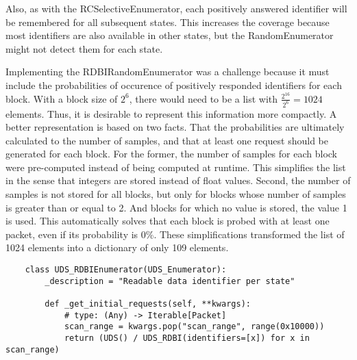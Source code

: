 Also, as with the RCSelectiveEnumerator, each positively answered identifier will be remembered for all subsequent states. This increases the coverage because most identifiers are also available in other states, but the RandomEnumerator might not detect them for each state.

Implementing the RDBIRandomEnumerator was a challenge because it must include the probabilities of occurence of positively responded identifiers for each block. With a block size of $2^6$, there would need to be a list with $\frac{2^{16}}{2^6} = 1024$ elements. Thus, it is desirable to represent this information more compactly. A better representation is based on two facts. That the probabilities are ultimately calculated to the number of samples, and that at least one request should be generated for each block. For the former, the number of samples for each block were pre-computed instead of being computed at runtime. This simplifies the list in the sense that integers are stored instead of float values. Second, the number of samples is not stored for all blocks, but only for blocks whose number of samples is greater than or equal to 2. And blocks for which no value is stored, the value 1 is used. This automatically solves that each block is probed with at least one packet, even if its probability is 0\%. These simplifications transformed the list of 1024 elements into a dictionary of only 109 elements.

\begin{verbatim}
    class UDS_RDBIEnumerator(UDS_Enumerator):
        _description = "Readable data identifier per state"

        def _get_initial_requests(self, **kwargs):
            # type: (Any) -> Iterable[Packet]
            scan_range = kwargs.pop("scan_range", range(0x10000))
            return (UDS() / UDS_RDBI(identifiers=[x]) for x in scan_range)
\end{verbatim}
    
